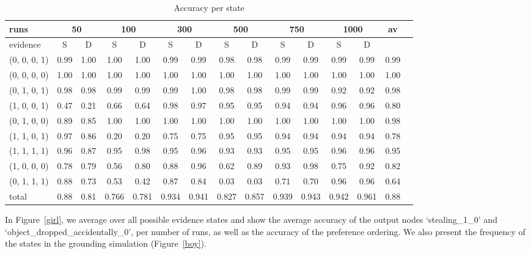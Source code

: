 \documentclass[12pt]{article}
\begin{document}
\begin{table}[htbp]
\footnotesize
\centering
\begin{tabular}{|l|c|c|c|c|c|c|c|c|c|c|c|c|c|c|}
\hline
	runs				&	\multicolumn{2}{|c|}{50}  &	\multicolumn{2}{|c|}{100}	&	\multicolumn{2}{|c|}{300} &	\multicolumn{2}{|c|}{500}	&	\multicolumn{2}{|c|}{750}&	\multicolumn{2}{|c|}{1000}	 & 	av	\\
\hline
	evidence						&	S	&	D	&	S	&	D	&	S	&	D	&	S	&	D	&	S	&	D	&	S	&	D	&		\\
\hline
(0, 	0, 	0, 	1) 				& 	0.99 & 1.00&	1.00 & 1.00	&	0.99 & 0.99	& 	0.98 & 0.98	& 	0.99 & 0.99	& 	0.99 & 0.99 & 0.99	\\
(0, 	0, 	0, 	0) 				& 	1.00 & 1.00&	1.00 & 1.00	&	1.00 & 1.00	& 	1.00 & 1.00	& 	1.00 & 1.00	& 	1.00 & 1.00& 1.00	\\
(0, 	1, 	0, 	1) 				& 	0.98 & 0.98&	0.99 & 0.99	&	0.99 & 1.00	& 	0.98 & 0.98	& 	0.99 & 0.99	& 	0.92 & 0.92& 0.98	\\
(1, 	0, 	0, 	1) 				& 	0.47 & 0.21&	0.66 & 0.64	&	0.98 & 0.97	& 	0.95 & 0.95	& 	0.94 & 0.94	& 	0.96 & 0.96& 0.80	\\
(0, 	1, 	0, 	0) 				& 	0.89 & 0.85&	1.00 & 1.00	&	1.00 & 1.00	& 	1.00 & 1.00	& 	1.00 & 1.00	& 	1.00 & 1.00& 0.98	\\
(1, 	1, 	0, 	1) 				& 	0.97 & 0.86&	0.20 & 0.20	&	0.75 & 0.75	& 	0.95 & 0.95	& 	0.94 & 0.94	& 	0.94 & 0.94& 0.78	\\
(1, 	1, 	1, 	1) 				& 	0.96 & 0.87&	0.95 & 0.98	&	0.95 & 0.96	& 	0.93 & 0.93	& 	0.95 & 0.95	& 	0.96 & 0.96& 0.95	\\
(1, 	0, 	0, 	0) 				& 	0.78 & 0.79&	0.56 & 0.80	&	0.88 & 0.96	& 	0.62 & 0.89	& 	0.93 & 0.98	& 	0.75 & 0.92& 0.82	\\
(0, 	1, 	1, 	1) 				& 	0.88 & 0.73&	0.53 & 0.42	&	0.87 & 0.84	& 	0.03 & 0.03	& 	0.71 & 0.70	& 	0.96 & 0.96& 0.64	\\
\hline
total    						& 	0.88 &  0.81 & 0.766 &  0.781 &    0.934 &  0.941   &     0.827 &  0.857 &    0.939 &  0.943 &     0.942 &  0.961   & 0.88 \\
\hline
\end{tabular}
\caption{Accuracy per state}
\label{eye}
\end{table}

In Figure~\ref{girl}, we average over all possible evidence states and show the average accuracy of the output nodes `stealing\_1\_0' and `object\_dropped\_accidentally\_0', per number of runs, as well as the accuracy of the preference ordering. We also present the frequency of the states in the grounding simulation (Figure~\ref{boy}).
\end{document}

